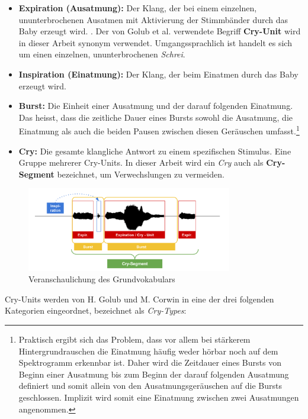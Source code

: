 \begin{itemize}
	\item \textbf{Expiration (Ausatmung):} Der Klang, der bei einem einzelnen, ununterbrochenen Ausatmen mit Aktivierung der Stimmbänder durch das Baby erzeugt wird. \cite{rythmic}. Der von Golub et al. \cite[S. 61]{cryModel} verwendete Begriff \textbf{Cry-Unit} wird in dieser Arbeit synonym verwendet. Umgangssprachlich ist handelt es sich um einen einzelnen, ununterbrochenen \emph{Schrei}.
	\item \textbf{Inspiration (Einatmung):} Der Klang, der beim Einatmen durch das Baby erzeugt wird.
	\item  \textbf{Burst:} Die Einheit einer Ausatmung und der darauf folgenden Einatmung. Das heisst, dass die zeitliche Dauer eines Bursts sowohl die Ausatmung, die Einatmung als auch die beiden Pausen zwischen diesen Geräuschen umfasst.\cite{rythmic}\footnote{Praktisch ergibt sich das Problem, dass vor allem bei stärkerem Hintergrundrauschen die Einatmung häufig weder hörbar noch auf dem Spektrogramm erkennbar ist. Daher wird die Zeitdauer eines Bursts von Beginn einer Ausatmung bis zum Beginn der darauf folgenden Ausatmung definiert und somit allein von den Ausatmungsgeräuschen auf die Bursts geschlossen. Implizit wird somit eine Einatmung zwischen zwei Ausatmungen angenommen.}
	\item  \textbf{Cry:} Die gesamte klangliche Antwort zu einem spezifischen Stimulus. Eine Gruppe mehrerer Cry-Units.\cite[S. 61]{cryModel} In dieser Arbeit wird ein \emph{Cry} auch als \textbf{Cry-Segment} bezeichnet, um Verwechslungen zu vermeiden.
\end{itemize}

\begin{figure}[H]
	\centering
	\includegraphics[width=0.8\textwidth]{bilder/cryVoc02.png}
	\caption{Veranschaulichung des Grundvokabulars}
	\label{img:cryVocabulary}
\end{figure}

Cry-Units werden von H. Golub und M. Corwin in eine der drei folgenden Kategorien eingeordnet, bezeichnet als \emph{Cry-Types}: \cite[S. 61 - 62]{cryModel}

